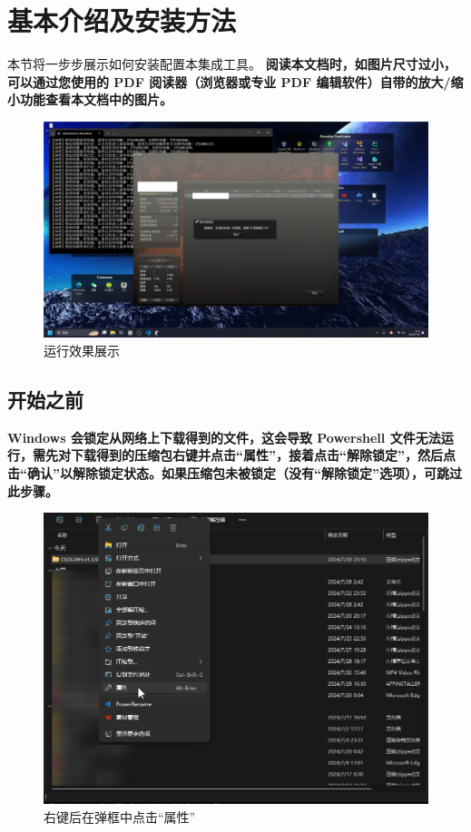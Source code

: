 \section{基本介绍及安装方法}

本节将一步步展示如何安装配置本集成工具。\textbf{\color{red} 阅读本文档时，如图片尺寸过小，可以通过您使用的 PDF 阅读器（浏览器或专业 PDF 编辑软件）自带的放大/缩小功能查看本文档中的图片。}

\begin{figure}[H]
    \Centering
    \includegraphics[width=\textwidth]{docs/assets/controller.png}
    \caption{运行效果展示}
\end{figure}

\subsection{开始之前}

\textbf{\color{red}Windows 会锁定从网络上下载得到的文件，这会导致 Powershell 文件无法运行，需先对下载得到的压缩包右键并点击“属性”，接着点击“解除锁定”，然后点击“确认”以解除锁定状态。如果压缩包未被锁定（没有“解除锁定”选项），可跳过此步骤。}

\begin{figure}[H]
    \Centering
    \includegraphics[width=\textwidth]{docs/assets/unlock_00.png}
    \caption{右键后在弹框中点击“属性”}
\end{figure}

